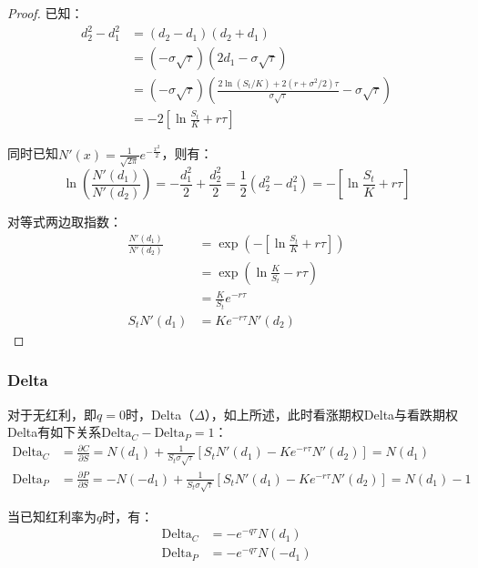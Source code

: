 \documentclass[11pt]{article}
\begin{document}
\begin{proof}
    已知：
    \begin{align*}
        d_2^2-d_1^2 &= (d_2-d_1)(d_2+d_1) \\
        &= (-\sigma\sqrt{\tau})(2d_1-\sigma\sqrt{\tau}) \\
        &= (-\sigma\sqrt{\tau})\left(\frac{2\ln(S_t/K) + 2(r+\sigma^2/2)\tau}{\sigma\sqrt{\tau}} -\sigma\sqrt{\tau}\right) \\
        &= -2\left[\ln\frac{S_t}{K}+r\tau\right]
    \end{align*}

    同时已知$N'(x)=\frac{1}{\sqrt{2\pi}} e^{-\frac{x^2}{2}}$，则有：
    \begin{equation*}
        \ln\left(\frac{N'(d_1)}{N'(d_2)}\right)
        = -\frac{d_1^2}{2} + \frac{d_2^2}{2}
        = \frac{1}{2} (d_2^2-d_1^2)
        = -\left[\ln\frac{S_t}{K} +r\tau\right]
    \end{equation*}

    对等式两边取指数：
    \begin{align*}
        \frac{N'(d_1)}{N'(d_2)} 
        &= \exp\left( -\left[\ln\frac{S_t}{K} +r\tau\right] \right) \\
        &= \exp \left( \ln\frac{K}{S_t}-r\tau \right) \\
        &= \frac{K}{S_t} e^{-r\tau} \\
        S_t N'(d_1) &= Ke^{-r\tau} N'(d_2)
    \end{align*}
\end{proof}

\subsubsection{Delta}

对于无红利，即$q=0$时，Delta（$\Delta$），如上所述，此时看涨期权Delta与看跌期权Delta有如下关系$\text{Delta}_C - \text{Delta}_P = 1$：
\begin{align*}
    \text{Delta}_C &= \frac{\partial C}{\partial S}
    = N(d_1) + \frac{1}{S_t\sigma\sqrt{\tau}} \left[ S_t N'(d_1)-Ke^{-r\tau}N'(d_2) \right] = N(d_1) \\
    \text{Delta}_P &= \frac{\partial P}{\partial S}
    = -N(-d_1) + \frac{1}{S_t\sigma\sqrt{\tau}} \left[ S_t N'(d_1)-Ke^{-r\tau}N'(d_2) \right] = N(d_1)-1
\end{align*}

当已知红利率为$q$时，有：
\begin{align*}
    \text{Delta}_C &= -e^{-q\tau} N(d_1) \\
    \text{Delta}_P &= -e^{-q\tau} N(-d_1)
\end{align*}
\end{document}

